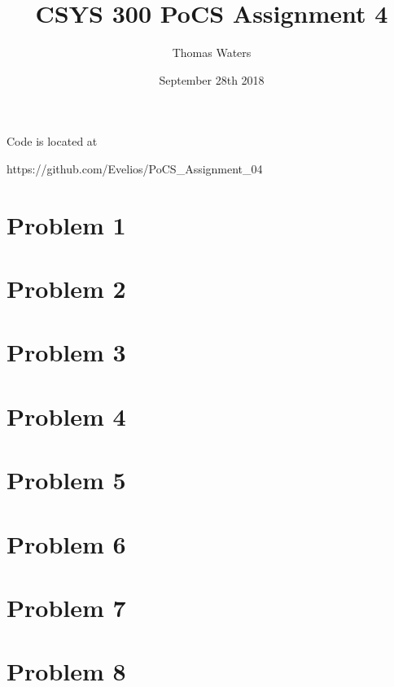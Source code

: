 \documentclass{article}
\title{CSYS 300 PoCS Assignment 4}
\author{Thomas Waters}
\date{September 28th 2018}
\begin{document}
\maketitle
Code is located at

https://github.com/Evelios/PoCS\_Assignment\_04

\section{Problem 1}


\section{Problem 2}


\section{Problem 3}


\section{Problem 4}


\section{Problem 5}


\section{Problem 6}


\section{Problem 7}


\section{Problem 8}

\end{document}
